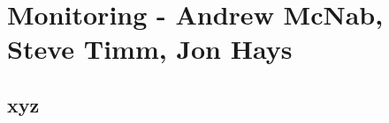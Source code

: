 \chapter{Monitoring - Andrew McNab, Steve Timm, Jon Hays}
\label{ch:mon}

\section{xyz}
\label{sec:mon:xyz}  %

